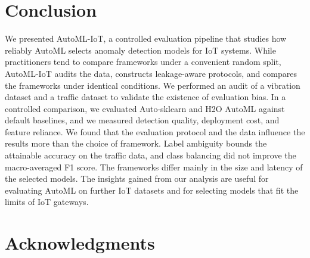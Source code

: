 \section{Conclusion}\label{sec:conclusion}
We presented AutoML-IoT, a controlled evaluation pipeline that studies how reliably AutoML selects anomaly detection models for IoT systems. While practitioners tend to compare frameworks under a convenient random split, AutoML-IoT audits the data, constructs leakage-aware protocols, and compares the frameworks under identical conditions. We performed an audit of a vibration dataset and a traffic dataset to validate the existence of evaluation bias. In a controlled comparison, we evaluated Auto-sklearn and H2O AutoML against default baselines, and we measured detection quality, deployment cost, and feature reliance. We found that the evaluation protocol and the data influence the results more than the choice of framework. Label ambiguity bounds the attainable accuracy on the traffic data, and class balancing did not improve the macro-averaged F1 score. The frameworks differ mainly in the size and latency of the selected models. The insights gained from our analysis are useful for evaluating AutoML on further IoT datasets and for selecting models that fit the limits of IoT gateways.

\section*{Acknowledgments}
